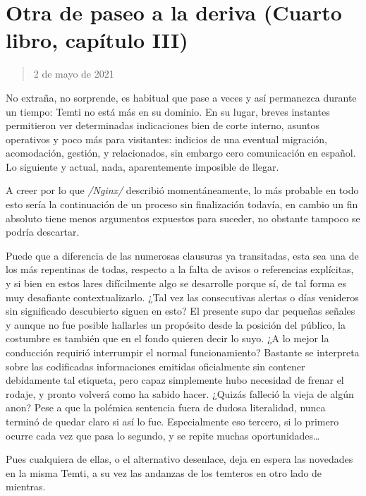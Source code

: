 \documentclass[
]{book}
\begin{document}
\hypertarget{otra-de-paseo-a-la-deriva-cuarto-libro-capuxedtulo-iii}{%
\section{Otra de paseo a la deriva (Cuarto libro, capítulo III)}\label{otra-de-paseo-a-la-deriva-cuarto-libro-capuxedtulo-iii}}

\begin{quote}
2 de mayo de 2021
\end{quote}

No extraña, no sorprende, es habitual que pase a veces y así permanezca durante un tiempo: Temti no está más en su dominio. En su lugar, breves instantes permitieron ver determinadas indicaciones bien de corte interno, asuntos operativos y poco más para visitantes: indicios de una eventual migración, acomodación, gestión, y relacionados, sin embargo cero comunicación en español. Lo siguiente y actual, nada, aparentemente imposible de llegar.

A creer por lo que \emph{/Nginx/} describió momentáneamente, lo más probable en todo esto sería la continuación de un proceso sin finalización todavía, en cambio un fin absoluto tiene menos argumentos expuestos para suceder, no obstante tampoco se podría descartar.

Puede que a diferencia de las numerosas clausuras ya transitadas, esta sea una de los más repentinas de todas, respecto a la falta de avisos o referencias explícitas, y si bien en estos lares difícilmente algo se desarrolle porque sí, de tal forma es muy desafiante contextualizarlo. ¿Tal vez las consecutivas alertas o días venideros sin significado descubierto siguen en esto? El presente supo dar pequeñas señales y aunque no fue posible hallarles un propósito desde la posición del público, la costumbre es también que en el fondo quieren decir lo suyo. ¿A lo mejor la conducción requirió interrumpir el normal funcionamiento? Bastante se interpreta sobre las codificadas informaciones emitidas oficialmente sin contener debidamente tal etiqueta, pero capaz simplemente hubo necesidad de frenar el rodaje, y pronto volverá como ha sabido hacer. ¿Quizás falleció la vieja de algún anon? Pese a que la polémica sentencia fuera de dudosa literalidad, nunca terminó de quedar claro si así lo fue. Especialmente eso tercero, si lo primero ocurre cada vez que pasa lo segundo, y se repite muchas oportunidades\ldots{}

Pues cualquiera de ellas, o el alternativo desenlace, deja en espera las novedades en la misma Temti, a su vez las andanzas de los temteros en otro lado de mientras.
\end{document}
